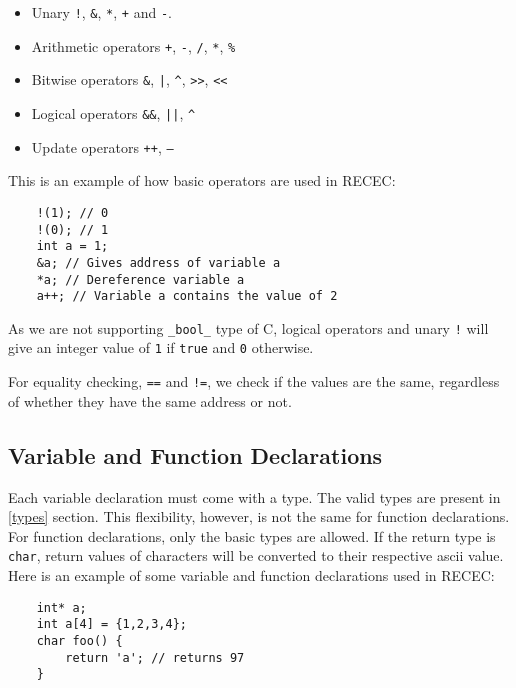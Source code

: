 \documentclass[a4paper]{article}
\begin{document}
\begin{itemize}
	\item Unary \texttt{!}, \texttt{\&}, \texttt{*}, \texttt{+} and \texttt{-}.
	\item Arithmetic operators \texttt{+}, \texttt{-}, \texttt{/}, \texttt{*}, \texttt{\%}
	\item Bitwise operators \texttt{\&}, \texttt{|}, \texttt{\^},  \texttt{>>}, \texttt{<<}
	\item Logical operators \texttt{\&\&}, \texttt{||}, \texttt{\^}
	\item Update operators \texttt{++}, \texttt{--}
\end{itemize}

This is an example of how basic operators are used in RECEC: 

\begin{verbatim}
	!(1); // 0
	!(0); // 1
	int a = 1;
	&a; // Gives address of variable a
	*a; // Dereference variable a
	a++; // Variable a contains the value of 2
\end{verbatim}

As we are not supporting \texttt{\_bool\_} type of C, logical operators and unary \texttt{!} will give an integer value of \texttt{1} if \texttt{true} and \texttt{0} otherwise. 

For equality checking, \texttt{==} and \texttt{!=}, we check if the values are the same, regardless of whether they have the same address or not.

\subsection{Variable and Function Declarations}
Each variable declaration must come with a type. The valid types are present in \ref{types} section. This flexibility, however, is not the same for function declarations. \\

For function declarations, only the basic types are allowed. If the return type is \texttt{char}, return values of characters will be converted to their respective ascii value. \\

Here is an example of some variable and function declarations used in RECEC: 

\begin{verbatim}
	int* a;
	int a[4] = {1,2,3,4};
	char foo() {
		return 'a'; // returns 97
	}
\end{verbatim}
\end{document}

